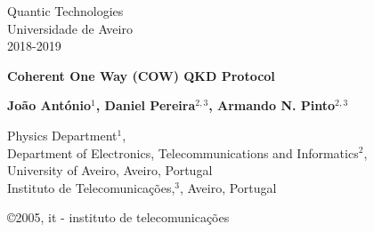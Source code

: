 \documentclass[5pt]{article}
\newcommand{\br}[1]{{\textbf{\color{itred} #1}}}%
\begin{document}
\begin{titlepage}  

\color{itblue} \sffamily \noindent \small
\hspace*{1cm}  Quantic Technologies\\
\hspace*{1cm}  Universidade de Aveiro\\ %
\hspace*{1cm}  2018-2019\\ 

\vspace*{1cm}
\begin{center}
    \color{black} \sffamily \noindent \Large
    \br{Coherent One Way (COW) QKD Protocol \\}
\end{center}
\vspace{6mm}
\begin{center}
    \color{black}
    \textbf{João António$^1$, Daniel Pereira$^{2,3}$, Armando N. Pinto$^{2,3}$\\}
    {}
\end{center}

\vspace{0.0mm}
\scriptsize
\begin{center}
Physics Department$^1$,\\
Department of Electronics, Telecommunications and Informatics$^2$,\\
University of Aveiro, Aveiro, Portugal\\
Instituto de Telecomunica\c{c}\~{o}es,$^3$, Aveiro, Portugal\\
\end{center}

\vspace{1.0cm}
\hspace*{13.2cm}\tiny \copyright 2005, it - instituto de telecomunica\c{c}\~{o}es\hfill

\end{titlepage}


\renewcommand{\headsep}{-25pt}

\end{document}
